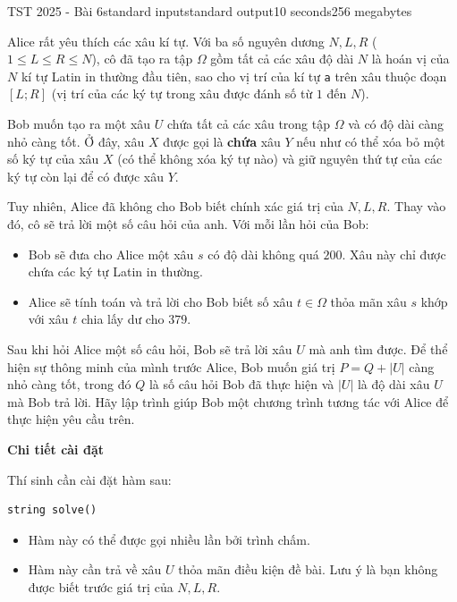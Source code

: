 \begin{problem}{TST 2025 - Bài 6}{standard input}{standard output}{10 seconds}{256 megabytes}

Alice rất yêu thích các xâu kí tự. Với ba số nguyên dương $N, L, R$ ($1 \le L \le R \le N$), cô đã tạo ra tập $\Omega$ gồm tất cả các xâu độ dài $N$ là hoán vị của $N$ kí tự Latin in thường đầu tiên, sao cho vị trí của kí tự \texttt{a} trên xâu thuộc đoạn $[L; R]$ (vị trí của các ký tự trong xâu được đánh số từ $1$ đến $N$).

Bob muốn tạo ra một xâu $U$ chứa tất cả các xâu trong tập $\Omega$ và có độ dài càng nhỏ càng tốt. Ở đây, xâu $X$ được gọi là \textbf{chứa} xâu $Y$ nếu như có thể xóa bỏ một số ký tự của xâu $X$ (có thể không xóa ký tự nào) và giữ nguyên thứ tự của các ký tự còn lại để có được xâu $Y$.

Tuy nhiên, Alice đã không cho Bob biết chính xác giá trị của $N,L,R$. Thay vào đó, cô sẽ trả lời một số câu hỏi của anh. Với mỗi lần hỏi của Bob:
\begin{itemize}
   \item Bob sẽ đưa cho Alice một xâu $s$ có độ dài không quá $200$. Xâu này chỉ được chứa các ký tự Latin in thường.
   \item Alice sẽ tính toán và trả lời cho Bob biết số xâu $t\in \Omega$ thỏa mãn xâu $s$ khớp với xâu $t$ chia lấy dư cho $379$.
\end{itemize}

Sau khi hỏi Alice một số câu hỏi, Bob sẽ trả lời xâu $U$ mà anh tìm được. Để thể hiện sự thông minh của mình trước Alice, Bob muốn giá trị $P=Q+|U|$ càng nhỏ càng tốt, trong đó $Q$ là số câu hỏi Bob đã thực hiện và $|U|$ là độ dài xâu $U$ mà Bob trả lời. Hãy lập trình giúp Bob một chương trình tương tác với Alice để thực hiện yêu cầu trên.

\InputFile
\textbf{Chi tiết cài đặt}

Thí sinh cần cài đặt hàm sau:

\begin{lstlisting}
string solve()
\end{lstlisting}

\begin{itemize}
   \item Hàm này có thể được gọi nhiều lần bởi trình chấm.
   \item Hàm này cần trả về xâu $U$ thỏa mãn điều kiện đề bài. Lưu ý là bạn không được biết trước giá trị của $N,L,R$.
\end{itemize}


\end{problem}
